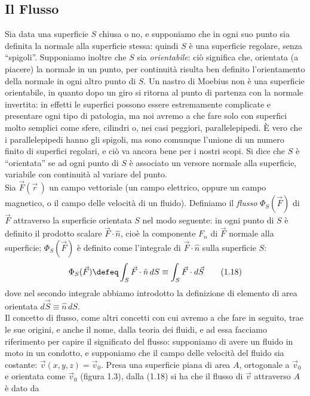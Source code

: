 \subsection{Il Flusso}

Sia data una superficie $S$ chiusa o no, e supponiamo che in ogni suo punto sia definita la normale alla superficie stessa: quindi $S$ è una superficie regolare, senza ``spigoli''. Supponiamo inoltre che $S$ sia \emph{orientabile}: ciò significa che, orientata (a piacere) la normale in un punto, per continuità risulta ben definito l'orientamento della normale in ogni altro punto di $S$. Un nastro di Moebius non è una superficie orientabile, in quanto dopo un giro si ritorna al punto di partenza con la normale invertita: in effetti le superfici possono essere estremamente complicate e presentare ogni tipo di patologia, ma noi avremo a che fare solo con superfici molto semplici come sfere, cilindri o, nei casi peggiori, parallelepipedi. È vero che i parallelepipedi hanno gli spigoli, ma sono comunque l'unione di un numero finito di superfici regolari, e ciò va ancora bene per i nostri scopi. Si dice che $S$ è ``orientata'' se ad ogni punto di $S$ è associato un versore normale alla superficie, variabile con continuità al variare del punto.\\
Sia $\vec F(\vec r\,)$ un campo vettoriale (un campo elettrico, oppure un campo magnetico, o il campo delle velocità di un fluido). Definiamo il \emph{flusso} $\Phi_S(\vec F)$ di $\vec F$ attraverso la superficie orientata $S$ nel modo seguente: in ogni punto di $S$ è definito il prodotto scalare $\vec F\cdot\hat n$, cioè la componente $F_n$ di $\vec F$ normale alla superficie; $\Phi_S(\vec F)$ è definito come l'integrale di $\vec F\cdot\hat n$ sulla superficie $S$:
\begin{equation}
\Phi_S(\vec F)\defeq\int_S\vec F\cdot\hat n\,dS\equiv\int_S\vec F\cdot d\vec S
\tag{1.18}
\end{equation}
dove nel secondo integrale abbiamo introdotto la definizione di elemento di area orientata $d\vec S\equiv\hat n\,dS$.\\
Il concetto di flusso, come altri concetti con cui avremo a che fare in seguito, trae le sue origini, e anche il nome, dalla teoria dei fluidi, e ad essa facciamo riferimento per capire il significato del flusso: supponiamo di avere un fluido in moto in un condotto, e supponiamo che il campo delle velocità del fluido sia costante: $\vec v(x,y,z)=\vec v_0$. Presa una superficie piana di area $A$, ortogonale a $\vec v_0$ e orientata come $\vec v_0$ (figura 1.3), dalla (1.18) si ha che il flusso di $\vec v$ attraverso $A$ è dato da
